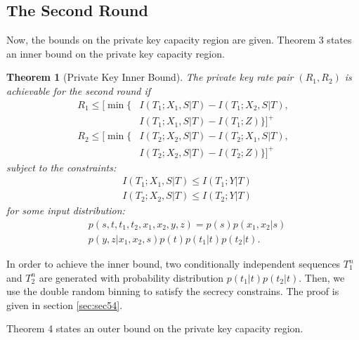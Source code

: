 \documentclass[conference,8pt]{IEEEtran}
\newtheorem{th1}{Theorem}
\begin{document}
{{{\subsection{The Second Round}\label{sec:sec32}{
Now, the bounds on the private key capacity region are given. Theorem 3 states an inner bound on the private key capacity region. 

\begin{th1}[Private Key Inner Bound]
The private key rate pair $(R_1,R_2)$ is achievable for the second round if 
\begin{align}
R_1 \leq [\min \{&I(T_1;X_1,S|T)- I(T_1;X_2,S|T), \nonumber \\
&I(T_1;X_1,S|T)-I(T_1;Z) \}]^+ \\
R_2 \leq [\min \{&I(T_2;X_2,S|T)- I(T_2;X_1,S|T) , \nonumber \\ 
&I(T_2;X_2,S|T)-I(T_2;Z) \}]^+ 
\end{align}
subject to the constraints:
\begin{align}
&I(T_1;X_1,S|T) \leq I(T_1;Y|T) \\
&I(T_2;X_2,S|T) \leq I(T_2;Y|T)
\end{align}
for some input distribution:
\begin{align}
&p(s,t,t_1,t_2,x_1,x_2,y,z)=p(s)p(x_1,x_2|s) \nonumber \\
&p(y,z|x_1,x_2,s)p(t)p(t_1|t)p(t_2|t).
\end{align}
\end{th1}
\begin{IEEEproof} In order to achieve the inner bound, two conditionally independent sequences $T^n_1$ and $T^n_2$ are generated with probability distribution $p(t_1|t)p(t_2|t)$. Then, we use the double random binning to satisfy the secrecy constrains. The proof is given in section \ref{sec:sec54}.
\end{IEEEproof} Theorem 4 states an outer bound on the private key capacity region.


}}}}
\end{document}
